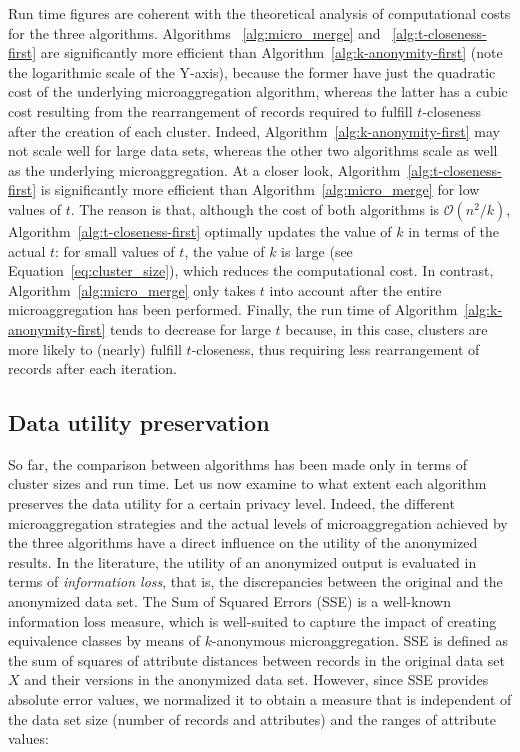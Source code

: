 \documentclass[10pt,journal,compsoc]{IEEEtran}
\theoremstyle{definition}
\theoremstyle{plain}
\begin{document}
Run time figures are coherent with the theoretical analysis of 
computational costs for the three algorithms. Algorithms ~\ref{alg:micro_merge} 
and ~\ref{alg:t-closeness-first} are significantly more efficient than Algorithm~\ref{alg:k-anonymity-first}
(note the logarithmic scale of the Y-axis), because the former have just 
the quadratic 
cost of the underlying microaggregation algorithm, 
whereas the latter has a cubic cost resulting from
the rearrangement of records required to fulfill $t$-closeness after the creation of each cluster.
Indeed, Algorithm~\ref{alg:k-anonymity-first} may 
not scale well for large
data sets, whereas the other two algorithms scale 
as well as the underlying microaggregation.
At a closer look, Algorithm~\ref{alg:t-closeness-first} is 
significantly more efficient than Algorithm~\ref{alg:micro_merge} for low values of $t$.
The reason is that, although the cost of both algorithms is $\mathcal{O}(n^2/k)$,
Algorithm~\ref{alg:t-closeness-first} optimally updates 
the value of $k$ in terms of the actual $t$:
for small values of $t$, the value of $k$ is large (see Equation~\ref{eq:cluster_size}),
which reduces the computational cost.
In contrast, Algorithm~\ref{alg:micro_merge} only takes $t$
into account after the entire microaggregation has been performed. 
Finally, the run time of Algorithm~\ref{alg:k-anonymity-first} tends 
to decrease for large $t$ because, in this case, clusters are more
likely to (nearly) fulfill
$t$-closeness, thus requiring less rearrangement of records 
after each iteration. 


\subsection{Data utility preservation}
\label{utility}

So far, the comparison between algorithms 
has been made only in terms of cluster sizes and run time.
Let us now examine to what extent each algorithm preserves 
the data utility for a certain privacy level.
Indeed, the different microaggregation strategies
and the actual levels of microaggregation achieved by the three algorithms
have a direct influence on the utility of the anonymized results.
In the literature, the utility of an anonymized output is evaluated in terms of \textit{information loss}, that is, 
the discrepancies between the original and the anonymized data set.  
The Sum of Squared Errors (SSE) is a well-known information loss measure, 
which is well-suited to capture the impact of creating
equivalence classes by means of $k$-anonymous microaggregation.
SSE is defined as 
the sum of squares of attribute distances between records
in the original data set $X$ and their versions in the anonymized data set.
However, since SSE provides absolute error values, we 
normalized it to obtain a measure that is independent of
the data set size 
(number of records and attributes) and the ranges of attribute values:
\end{document}
